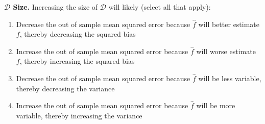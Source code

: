 \item {}
\textbf{$\mathcal{D}$ Size.}
Increasing the size of $\mathcal{D}$ will likely (select all that apply):

\begin{enumerate}[label=(\alph*)]
    \item Decrease the out of sample mean squared error because $\hat{f}$ will better estimate $f$, thereby decreasing the squared bias
    \item Increase the out of sample mean squared error because $\hat{f}$ will worse estimate $f$, thereby increasing the squared bias
    \item Decrease the out of sample mean squared error because $\hat{f}$ will be less variable, thereby decreasing the variance
    \item Increase the out of sample mean squared error because $\hat{f}$ will be more variable, thereby increasing the variance
\end{enumerate} 
